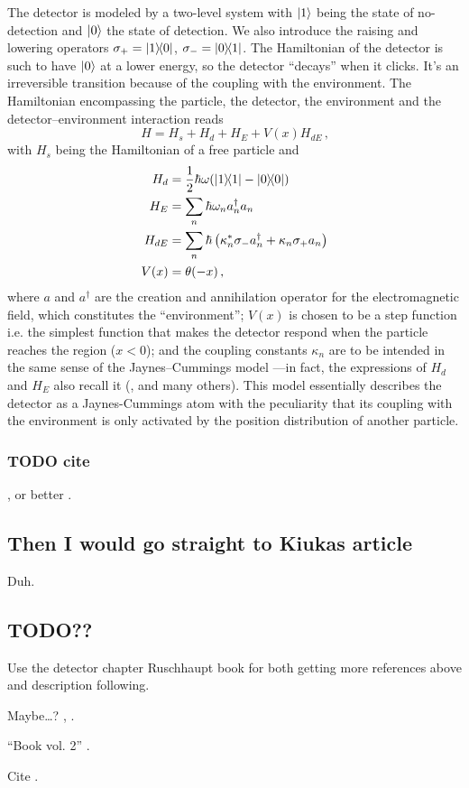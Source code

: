 The detector is modeled by a two-level system with $\ket{1}$ being the state of no-detection
and $\ket{0}$ the state of detection.
We also introduce the raising and lowering operators $\sigma_{+}=\ketbra{1}{0}$, $\sigma_{-}=\ketbra{0}{1}$.
The Hamiltonian of the detector is such to have $\ket{0}$
at a lower energy, so the detector ``decays'' when it clicks. It's an irreversible transition because
of the coupling with the environment.
The Hamiltonian encompassing the particle, the detector, the environment and the detector--environment interaction reads
\begin{equation}
  H = H_s + H_d + H_{E} + V(x)  H_{dE} \,\text{,}
\end{equation}
with $H_s$ being the Hamiltonian of a free particle and
\begin{align}
  H_d     &= \frac{1}{2}\hbar\omega \qty(\ketbra{1} - \ketbra{0}) \\
  H_{E}   &= \sum_n \hbar \omega_n a_n^{\dag} a_n \\
  H_{dE}  &= \sum_n \hbar \left( \kappa^*_n \sigma_{-} a_n^{\dag} + \kappa_n \sigma_{+} a_n \right) \\
  V(x)    &= \theta(-x) \,\text{,}
\end{align}
where $a$ and $a^{\dagger}$ are the creation and annihilation operator for the electromagnetic field,
which constitutes the ``environment''; $V(x)$ is chosen to be a step function
i.e. the simplest function that makes the detector respond
when the particle reaches the region ($x<0$);
and the coupling constants $\kappa_{n}$ are to be intended in the same sense of the Jaynes--Cummings model
---in fact, the expressions of $H_d$ and $H_E$ also recall it
(\cite[\S 10.2]{WallsMilburn}, \cite{JCM} and many others).
This model essentially describes the detector as a Jaynes-Cummings atom
with the peculiarity that its coupling with the environment
is only activated by the position distribution
of another particle.

\subsubsection{TODO cite}
\cite{Damborenea}, or better \cite{Damborenea_atomic}.

\subsection{Then I would go straight to Kiukas article}

Duh.

\subsection*{TODO??}

Use the detector chapter Ruschhaupt book for both getting more references above and description following.

Maybe\dots? \cite{ProbCurrent}, \cite{Ruschhaupt_QMoT}.

``Book vol. 2'' \cite{TQM2:Detector}.

Cite \cite{Muga_ArrTimeOpNormal, Sudarshan_Zeno, Echanobe, Savvidou-1, Savvidou-2}.

